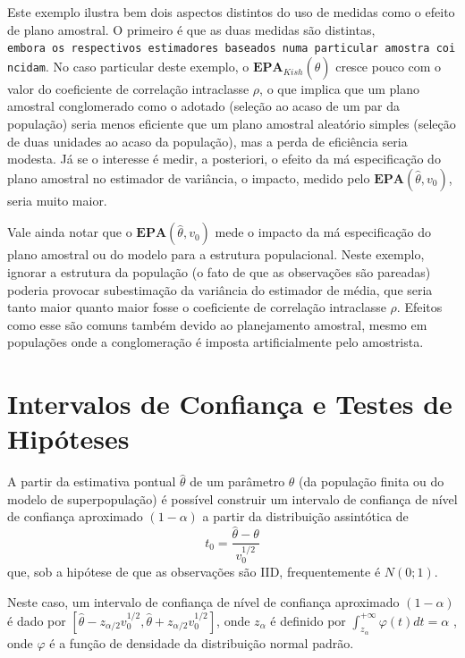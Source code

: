 \documentclass[]{book}
\theoremstyle{definition}
\theoremstyle{definition}
\theoremstyle{definition}
\theoremstyle{remark}
\begin{document}
Este exemplo ilustra bem dois aspectos distintos do uso de medidas como
o efeito de plano amostral. O primeiro é que as duas medidas são
distintas,
\texttt{embora\ os\ respectivos\ estimadores\ baseados\ numa\ particular\ amostra\ coincidam}.
No caso particular deste exemplo, o
\(\mathbf{EPA}_{Kish}\left( \hat{\theta}\right)\) cresce pouco com o
valor do coeficiente de correlação intraclasse \(\rho\), o que implica
que um plano amostral conglomerado como o adotado (seleção ao acaso de
um par da população) seria menos eficiente que um plano amostral
aleatório simples (seleção de duas unidades ao acaso da população), mas
a perda de eficiência seria modesta. Já se o interesse é medir, a
posteriori, o efeito da má especificação do plano amostral no estimador
de variância, o impacto, medido pelo
\(\mathbf{EPA}\left( \hat{\theta},v_{0}\right)\), seria muito maior.

Vale ainda notar que o \(\mathbf{EPA}\left( \hat{\theta},v_{0}\right)\)
mede o impacto da má especificação do plano amostral ou do modelo para a
estrutura populacional. Neste exemplo, ignorar a estrutura da população
(o fato de que as observações são pareadas) poderia provocar
subestimação da variância do estimador de média, que seria tanto maior
quanto maior fosse o coeficiente de correlação intraclasse \(\rho\).
Efeitos como esse são comuns também devido ao planejamento amostral,
mesmo em populações onde a conglomeração é imposta artificialmente pelo
amostrista.

\section{Intervalos de Confiança e Testes de Hipóteses}\label{icth}

A partir da estimativa pontual \(\hat{\theta}\) de um parâmetro
\(\theta\) (da população finita ou do modelo de superpopulação) é
possível construir um intervalo de confiança de nível de confiança
aproximado \(\left( 1-\alpha \right)\) a partir da distribuição
assintótica de \[
t_{0}=\frac{\hat{\theta}-\theta }{v_{0}^{1/2}} 
\] que, sob a hipótese de que as observações são IID, frequentemente é
\(N\left( 0;1\right)\).

Neste caso, um intervalo de confiança de nível de confiança aproximado
\(\left( 1-\alpha \right)\) é dado por
\(\left[ \hat{\theta}-z_{\alpha /2}v_{0}^{1/2},\hat{\theta}+z_{\alpha /2}v_{0}^{1/2}\right]\),
onde \(z_{\alpha }\) é definido por
\(\int_{z_{\alpha }}^{+\infty }\varphi\left( t\right) dt=\alpha\) , onde
\(\varphi\) é a função de densidade da distribuição normal padrão.
\end{document}
